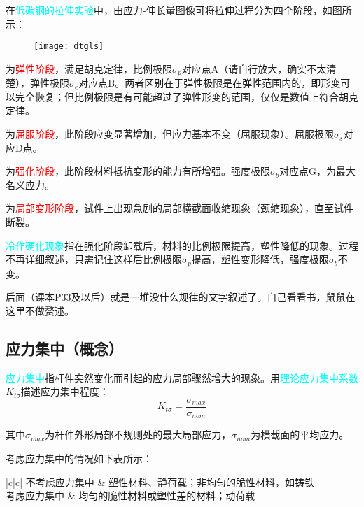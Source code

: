 \documentclass[10pt,a4paper]{ctexart}
\begin{document}
在\textcolor{cyan}{低碳钢的拉伸实验}中，由应力-伸长量图像可将拉伸过程分为四个阶段，如图所示：
\begin{figure}[htp]%
	\centering
	\texttt{[image: dtgls]}
\end{figure}

\uppercase\expandafter{}为\textcolor{red}{弹性阶段}，满足胡克定律，比例极限$\sigma_p$对应点A（请自行放大，确实不太清楚），弹性极限$\sigma_e$对应点B。两者区别在于弹性极限是在弹性范围内的，即形变可以完全恢复；但比例极限是有可能超过了弹性形变的范围，仅仅是数值上符合胡克定律\cite{匿名用户2017}。

\uppercase\expandafter{}为\textcolor{red}{屈服阶段}，此阶段应变显著增加，但应力基本不变（屈服现象）。屈服极限$\sigma_s$对应D点。

\uppercase\expandafter{}为\textcolor{red}{强化阶段}，此阶段材料抵抗变形的能力有所增强。强度极限$\sigma_b$对应点G，为最大名义应力。

\uppercase\expandafter{}为\textcolor{red}{局部变形阶段}，试件上出现急剧的局部横截面收缩现象（颈缩现象），直至试件断裂。

\textcolor{cyan}{冷作硬化现象}指在强化阶段卸载后，材料的比例极限提高，塑性降低的现象。过程不再详细叙述，只需记住这样后比例极限$\sigma_p$提高，塑性变形降低，强度极限$\sigma_b$不变。

后面（课本P33及以后）就是一堆没什么规律的文字叙述了。自己看看书，鼠鼠在这里不做赘述。

\subsection{应力集中（概念）}
\textcolor{cyan}{应力集中}指杆件突然变化而引起的应力局部骤然增大的现象。用\textcolor{cyan}{理论应力集中系数}$K_{t\sigma}$描述应力集中程度：
\begin{equation}
	K_{t\sigma}=\frac{\sigma_{max}}{\sigma_{nom}}
\end{equation}

其中$\sigma_{max}$为杆件外形局部不规则处的最大局部应力，$\sigma_{nom}$为横截面的平均应力。

考虑应力集中的情况如下表所示：
\begin{table}[h]
	\centering
	\begin{tblr}{|c|c|}%
		\hline
		不考虑应力集中 & 塑性材料、静荷载；非均匀的脆性材料，如铸铁\\
		\hline
		考虑应力集中 & 均匀的脆性材料或塑性差的材料；动荷载\\
		\hline	
	\end{tblr}
\end{table}
\newpage
\end{document}

